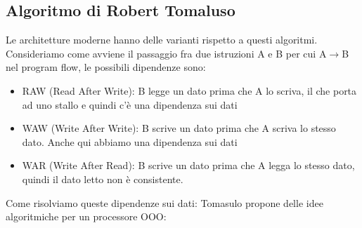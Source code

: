 \documentclass[14pt, oneside]{book}
\begin{document}
\subsection{Algoritmo di Robert Tomaluso}
Le architetture moderne hanno delle varianti rispetto a questi algoritmi. Consideriamo come avviene il passaggio fra due istruzioni A e B per cui A$\rightarrow$B nel program flow, le possibili dipendenze sono:
\begin{itemize}
\item RAW (Read After Write): B legge un dato prima che A lo scriva, il che porta ad uno stallo e quindi c'è una dipendenza sui dati
\item WAW (Write After Write): B scrive un dato prima che A scriva lo stesso dato. Anche qui abbiamo una dipendenza sui dati
\item WAR (Write After Read): B scrive un dato prima che A legga lo stesso dato, quindi il dato letto non è consistente.
\end{itemize}
Come risolviamo queste dipendenze sui dati: Tomasulo propone delle idee algoritmiche per un processore OOO:
\end{document}
